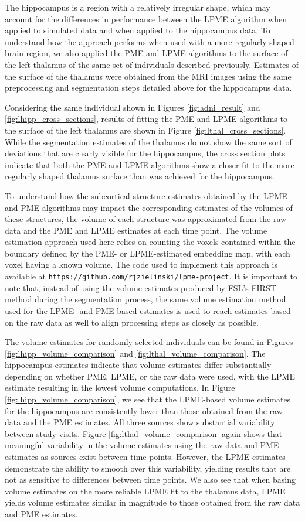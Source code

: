\documentclass[11pt,reqno]{article}
\theoremstyle{definition}
\begin{document}
The hippocampus is a region with a relatively irregular shape, which may account for the differences in performance between the LPME algorithm when applied to simulated data and when applied to the hippocampus data. To understand how the approach performs when used with a more regularly shaped brain region, we also applied the PME and LPME algorithms to the surface of the left thalamus of the same set of individuals described previously. Estimates of the surface of the thalamus were obtained from the MRI images using the same preprocessing and segmentation steps detailed above for the hippocampus data.

Considering the same individual shown in Figures \ref{fig:adni_result} and \ref{fig:lhipp_cross_sections}, results of fitting the PME and LPME algorithms to the surface of the left thalamus are shown in Figure \ref{fig:lthal_cross_sections}. While the segmentation estimates of the thalamus do not show the same sort of deviations that are clearly visible for the hippocampus, the cross section plots indicate that both the PME and LPME algorithms show a closer fit to the more regularly shaped thalamus surface than was achieved for the hippocampus.

To understand how the subcortical structure estimates obtained by the LPME and PME algorithms may impact the corresponding estimates of the volumes of these structures, the volume of each structure was approximated from the raw data and the PME and LPME estimates at each time point. The volume estimation approach used here relies on counting the voxels contained within the boundary defined by the PME- or LPME-estimated embedding map, with each voxel having a known volume.  The code used to implement this approach is available at \texttt{https://github.com/rjzielinski/lpme-project}. It is important to note that, instead of using the volume estimates produced by FSL's FIRST method during the segmentation process, the same volume estimation method used for the LPME- and PME-based estimates is used to reach estimates based on the raw data as well to align processing steps as closely as possible.

The volume estimates for randomly selected individuals can be found in Figures \ref{fig:lhipp_volume_comparison} and \ref{fig:lthal_volume_comparison}. The hippocampus estimates indicate that volume estimates differ substantially depending on whether PME, LPME, or the raw data were used, with the LPME estimate resulting in the lowest volume computations. In Figure \ref{fig:lhipp_volume_comparison}, we see that the LPME-based volume estimates for the hippocampus are consistently lower than those obtained from the raw data and the PME estimates. All three sources show substantial variability between study visits. Figure \ref{fig:lthal_volume_comparison} again shows that meaningful variability in the volume estimates using the raw data and PME estimates as sources exist between time points. However, the LPME estimates demonstrate the ability to smooth over this variability, yielding results that are not as sensitive to differences between time points. We also see that when basing volume estimates on the more reliable LPME fit to the thalamus data, LPME yields volume estimates similar in magnitude to those obtained from the raw data and PME estimates.
\end{document}
